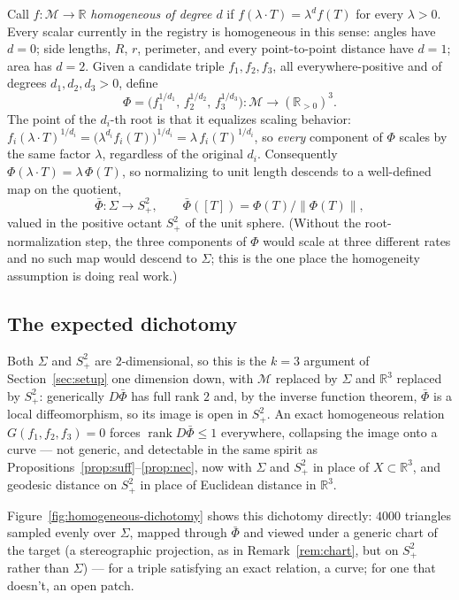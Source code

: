 \documentclass[11pt,reqno]{amsart}
\numberwithin{equation}{section}
\theoremstyle{definition}
\theoremstyle{remark}
\newcommand{\M}{\mathcal{M}}
\begin{document}
Call $f:\M\to\mathbb R$ \emph{homogeneous of degree $d$} if
$f(\lambda\cdot T)=\lambda^d f(T)$ for every $\lambda>0$. Every scalar
currently in the registry is homogeneous in this sense: angles have
$d=0$; side lengths, $R$, $r$, perimeter, and every point-to-point distance
have $d=1$; area has $d=2$. Given a candidate triple $f_1,f_2,f_3$, all
everywhere-positive and of degrees $d_1,d_2,d_3>0$, define
\begin{equation}
  \Phi=\bigl(f_1^{1/d_1},\,f_2^{1/d_2},\,f_3^{1/d_3}\bigr):\M\to(\mathbb
  R_{>0})^3 .
\end{equation}
The point of the $d_i$-th root is that it equalizes scaling behavior:
$f_i(\lambda\cdot T)^{1/d_i}=\bigl(\lambda^{d_i}f_i(T)\bigr)^{1/d_i}
=\lambda\,f_i(T)^{1/d_i}$, so \emph{every} component of $\Phi$ scales by the
same factor $\lambda$, regardless of the original $d_i$. Consequently
$\Phi(\lambda\cdot T)=\lambda\,\Phi(T)$, so normalizing to unit length
descends to a well-defined map on the quotient,
\begin{equation}
  \bar\Phi:\Sigma\longrightarrow S^2_+ ,\qquad
  \bar\Phi([T])=\Phi(T)/\|\Phi(T)\| ,
\end{equation}
valued in the positive octant $S^2_+$ of the unit sphere. (Without the
root-normalization step, the three components of $\Phi$ would scale at
three different rates and no such map would descend to $\Sigma$; this is
the one place the homogeneity assumption is doing real work.)

\subsection{The expected dichotomy}

Both $\Sigma$ and $S^2_+$ are $2$-dimensional, so this is the $k=3$
argument of Section~\ref{sec:setup} one dimension down, with $\M$ replaced
by $\Sigma$ and $\mathbb R^3$ replaced by $S^2_+$: generically
$D\bar\Phi$ has full rank $2$ and, by the inverse function theorem,
$\bar\Phi$ is a local diffeomorphism, so its image is open in $S^2_+$. An
exact homogeneous relation $G(f_1,f_2,f_3)=0$ forces $\operatorname{rank}
D\bar\Phi\le1$ everywhere, collapsing the image onto a curve --- not
generic, and detectable in the same spirit as
Propositions~\ref{prop:suff}--\ref{prop:nec}, now with $\Sigma$ and
$S^2_+$ in place of $X\subset\mathbb R^3$, and geodesic distance on $S^2_+$
in place of Euclidean distance in $\mathbb R^3$.

Figure~\ref{fig:homogeneous-dichotomy} shows this dichotomy directly:
$4000$ triangles sampled evenly over $\Sigma$, mapped through $\bar\Phi$ and
viewed under a generic chart of the target (a stereographic projection, as
in Remark~\ref{rem:chart}, but on $S^2_+$ rather than $\Sigma$) --- for a
triple satisfying an exact relation, a curve; for one that doesn't, an open
patch.
\end{document}
